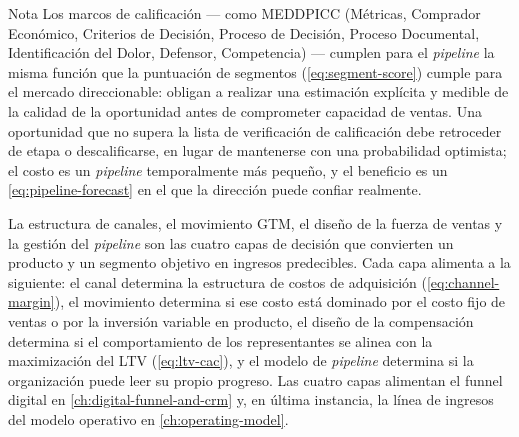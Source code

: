 \begin{admonition}{Nota}
Los marcos de calificación --- como MEDDPICC (Métricas, Comprador Económico, Criterios de
Decisión, Proceso de Decisión, Proceso Documental, Identificación del Dolor, Defensor,
Competencia) --- cumplen para el \emph{pipeline} la misma función que la puntuación de segmentos
(\cref{eq:segment-score}) cumple para el mercado direccionable: obligan a realizar una estimación
explícita y medible de la calidad de la oportunidad antes de comprometer capacidad de ventas. Una
oportunidad que no supera la lista de verificación de calificación debe retroceder de etapa o
descalificarse, en lugar de mantenerse con una probabilidad optimista; el costo es un
\emph{pipeline} temporalmente más pequeño, y el beneficio es un \cref{eq:pipeline-forecast} en
el que la dirección puede confiar realmente.
\end{admonition}

La estructura de canales, el movimiento GTM, el diseño de la fuerza de ventas y la gestión del
\emph{pipeline} son las cuatro capas de decisión que convierten un producto y un segmento objetivo
en ingresos predecibles. Cada capa alimenta a la siguiente: el canal determina la estructura de
costos de adquisición (\cref{eq:channel-margin}), el movimiento determina si ese costo está
dominado por el costo fijo de ventas o por la inversión variable en producto, el diseño de la
compensación determina si el comportamiento de los representantes se alinea con la maximización
del LTV (\cref{eq:ltv-cac}), y el modelo de \emph{pipeline} determina si la organización puede
leer su propio progreso. Las cuatro capas alimentan el funnel digital en
\cref{ch:digital-funnel-and-crm} y, en última instancia, la línea de ingresos del modelo
operativo en \cref{ch:operating-model}.
